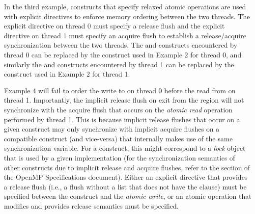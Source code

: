 
{}
In the third example,  constructs that specify relaxed atomic
operations are used with explicit  directives to enforce memory
ordering between the two threads. The explicit  directive on thread
0 must specify a release flush and the explicit  directive on
thread 1 must specify an acquire flush to establish a release/acquire
synchronization between the two threads. The  and 
constructs encountered by thread 0 can be replaced by the  construct used in
Example 2 for thread 0, and similarly the  and 
constructs encountered by thread 1 can be replaced by the 
construct used in Example 2 for thread 1.


Example 4 will fail to order the write to  on thread 0 before the read
from  on thread 1. Importantly, the implicit release flush on exit from
the  region will not synchronize with the acquire flush that
occurs on the \emph{atomic read} operation performed by thread 1. This is because
implicit release flushes that occur on a given construct may only synchronize
with implicit acquire flushes on a compatible construct (and vice-versa) that
internally makes use of the same synchronization variable. For a
 construct, this might correspond to a \emph{lock} object that
is used by a given implementation (for the synchronization semantics of other
constructs due to implicit release and acquire flushes, refer to the  section of the OpenMP Specifications document).  Either an explicit 
directive that provides a release flush (i.e., a flush without a list that does
not have the  clause) must be specified between the
 construct and the \emph{atomic write}, or an atomic operation that
modifies  and provides release semantics must be specified.

